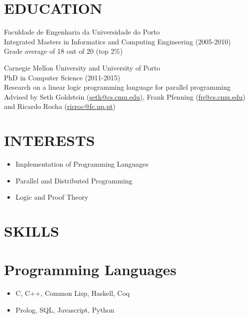 \documentclass[margin]{res}
\begin{document}

\address{Rua 1º de Maio, nº 48 \\   3515-560 Bodiosa, Portugal \\   (+351) 936 229 412 \\ flaviocruz@gmail.com \\ \url{http://cs.cmu.edu/~fmfernan}}

\begin{resume}

\section{EDUCATION}       Faculdade de Engenharia da Universidade do Porto \\
                Integrated Masters in Informatics and Computing Engineering (2005-2010) \\
                Grade average of 18 out of 20 (top 2\%)
                
                Carnegie Mellon University and University of Porto \\
                PhD in Computer Science (2011-2015) \\
                Research on a linear logic programming language for parallel programming \\
                Advised by Seth Goldstein (\url{seth@cs.cmu.edu}), Frank Pfenning (\url{fp@cs.cmu.edu}) and Ricardo Rocha (\url{ricroc@fc.up.pt})\\

\section{INTERESTS}

                 \begin{itemize}
                    \item Implementation of Programming Languages
                    \item Parallel and Distributed Programming
                    \item Logic and Proof Theory
                 \end{itemize}
                  
\section{SKILLS} 
\normalsize{\section{Programming Languages}}
                 \begin{itemize}
                 \item C, C++, Common Lisp, Haskell, Coq
                 \item Prolog, SQL, Javascript, Python
                 \end{itemize}
                 

\end{resume}
\end{document}
